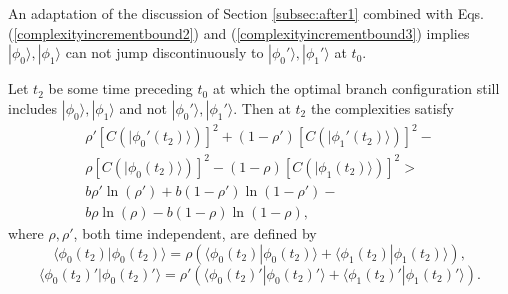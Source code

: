 \documentclass[12pt,amsmath,amssymb,onecolumn]{revtex4-2}
\begin{document}
An adaptation of the discussion of
Section \ref{subsec:after1} combined with
Eqs. (\ref{complexityincrementbound2}) and
(\ref{complexityincrementbound3})
implies $|\phi_0 \rangle , |\phi_1 \rangle $
can not jump discontinuously to
$|\phi_0' \rangle , |\phi_1' \rangle $ at $t_0$.

Let $t_2$ be some time preceding $t_0$ at which
the optimal branch configuration still includes 
$|\phi_0 \rangle , |\phi_1 \rangle $
and not
$|\phi_0' \rangle , |\phi_1' \rangle $.
Then at $t_2$
the complexities satisfy
\begin{multline}
  \label{splitcondition3}
  \rho' [C( |\phi_0'(t_2) \rangle )]^2 + ( 1 - \rho') [C( |\phi_1'(t_2) \rangle )]^2 - \\
  \rho [C( |\phi_0(t_2) \rangle )]^2 - ( 1 - \rho) [C( |\phi_1(t_2) \rangle )]^2 > \\
 b \rho' \ln( \rho') + b ( 1 - \rho') \ln( 1 - \rho') - \\
 b \rho \ln( \rho) - b ( 1 - \rho) \ln( 1 - \rho),
\end{multline}
where $\rho, \rho'$, both time independent, are defined by
\begin{equation}
    \label{rho2}
     \langle  \phi_0(t_2) | \phi_0(t_2) \rangle  =  \rho ( \langle  \phi_0(t_2) | \phi_0(t_2) \rangle  +  \langle \phi_1(t_2)|\phi_1(t_2) \rangle ),
\end{equation}
\begin{equation}
    \label{rho2prime}
     \langle  \phi_0(t_2)' | \phi_0(t_2)' \rangle  =  \rho' ( \langle  \phi_0(t_2)' | \phi_0(t_2)' \rangle  +  \langle \phi_1(t_2)'|\phi_1(t_2)' \rangle ).
\end{equation}
\end{document}
